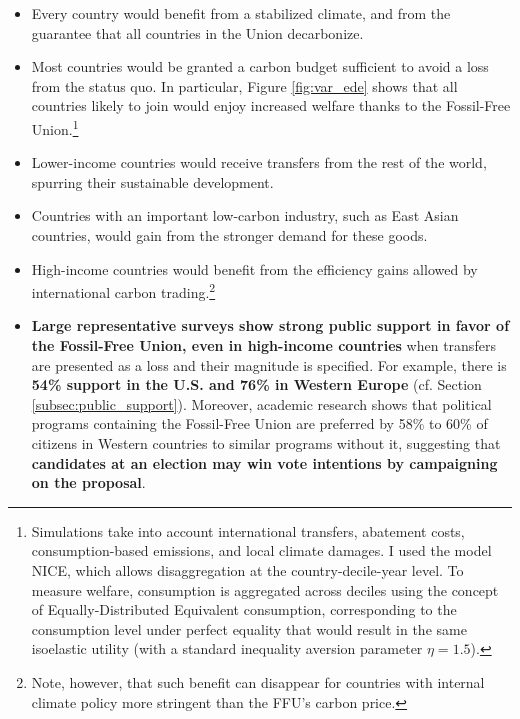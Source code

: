 \documentclass[12pt,english]{article}
\begin{document}
\begin{itemize}
  \item Every country would benefit from a stabilized climate, and from the guarantee that all countries in the Union decarbonize.
  \item Most countries would be granted a carbon budget sufficient to avoid a loss from the status quo. In particular, Figure \ref{fig:var_ede} shows that all countries likely to join would enjoy increased welfare thanks to the Fossil-Free Union.\footnote{\label{ede}Simulations take into account international transfers, abatement costs, consumption-based emissions, and local climate damages. I used the model NICE,\citep{young-brun_within-country_2025} which allows disaggregation at the country-decile-year level. To measure welfare, consumption is aggregated across deciles using the concept of Equally-Distributed Equivalent consumption, corresponding to the consumption level under perfect equality that would result in the same  isoelastic utility (with a standard inequality aversion parameter $\eta=1.5$).} %
  \item Lower-income countries would receive transfers from the rest of the world, spurring their sustainable development.
  \item Countries with an important low-carbon industry, such as East Asian countries, would gain from the stronger demand for these goods.
  \item High-income countries would benefit from the efficiency gains allowed by international carbon trading.\footnote{Note, however, that such benefit can disappear for countries with internal climate policy more stringent than the FFU's carbon price.}
  \item \textbf{Large representative surveys show strong public support in favor of the Fossil-Free Union, even in high-income countries} when transfers are presented as a loss and their magnitude is specified. For example, there is\textbf{ 54\% support in the U.S. and 76\% in Western Europe} (cf. Section \ref{subsec:public_support}).\cite{fabre_majority_2025} 
  Moreover, academic research shows that political programs containing the Fossil-Free Union are preferred by 58\% to 60\% of citizens in Western countries to similar programs without it, suggesting that \textbf{candidates at an election may win vote intentions by campaigning on the proposal}.\cite{fabre_majority_2025}
\end{itemize}
\end{document}
